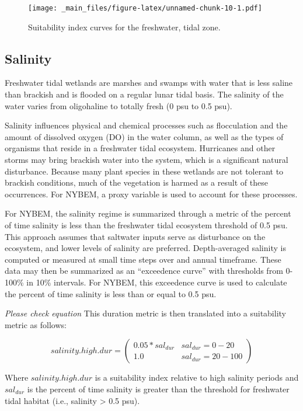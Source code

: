 \documentclass[
]{book}
\begin{document}
\begin{figure}
\centering
\texttt{[image: \_main\_files/figure-latex/unnamed-chunk-10-1.pdf]}
\caption{\label{fig:unnamed-chunk-10}Suitability index curves for the freshwater, tidal zone.}
\end{figure}

\hypertarget{salinity}{%
\subsection{Salinity}\label{salinity}}

Freshwater tidal wetlands are marshes and swamps with water that is less saline than brackish and is flooded on a regular lunar tidal basis. The salinity of the water varies from oligohaline to totally fresh (0 psu to 0.5 psu).

Salinity influences physical and chemical processes such as flocculation and the amount of dissolved oxygen (DO) in the water column, as well as the types of organisms that reside in a freshwater tidal ecosystem. Hurricanes and other storms may bring brackish water into the system, which is a significant natural disturbance. Because many plant species in these wetlands are not tolerant to brackish conditions, much of the vegetation is harmed as a result of these occurrences. For NYBEM, a proxy variable is used to account for these processes.

For NYBEM, the salinity regime is summarized through a metric of the percent of time salinity is less than the freshwater tidal ecosystem threshold of 0.5 psu. This approach assumes that saltwater inputs serve as disturbance on the ecosystem, and lower levels of salinity are preferred. Depth-averaged salinity is computed or measured at small time steps over and annual timeframe. These data may then be summarized as an ``exceedence curve'' with thresholds from 0-100\% in 10\% intervals. For NYBEM, this exceedence curve is used to calculate the percent of time salinity is less than or equal to 0.5 psu.

\emph{Please check equation}
This duration metric is then translated into a suitability metric as follows:

\[salinity.high.dur = \begin{pmatrix} 0.05*sal_{dur} & sal_{dur}=0-20\\
1.0 & sal_{dur}=20-100
\end{pmatrix}\]

Where \(salinity.high.dur\) is a suitability index relative to high salinity periods and \(sal_{dur}\) is the percent of time salinity is greater than the threshold for freshwater tidal habitat (i.e., salinity \textgreater{} 0.5 psu).
\end{document}
